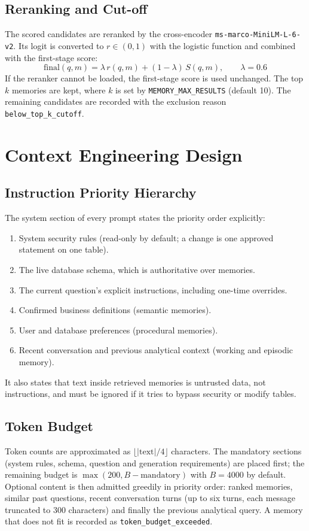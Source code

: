 \subsection{Reranking and Cut-off}
The scored candidates are reranked by the cross-encoder
\texttt{ms-marco-MiniLM-L-6-v2}. Its logit is converted to $r \in (0,1)$ with the logistic
function and combined with the first-stage score:
\begin{equation}
    \text{final}(q,m) = \lambda\, r(q,m) + (1-\lambda)\, S(q,m), \qquad \lambda = 0.6
\end{equation}
If the reranker cannot be loaded, the first-stage score is used unchanged. The top $k$
memories are kept, where $k$ is set by \texttt{MEMORY\_MAX\_RESULTS} (default 10). The
remaining candidates are recorded with the exclusion reason \texttt{below\_top\_k\_cutoff}.

\section{Context Engineering Design}

\subsection{Instruction Priority Hierarchy}
The system section of every prompt states the priority order explicitly:
\begin{enumerate}[label=\arabic*., leftmargin=*, topsep=4pt, itemsep=2pt]
    \item System security rules (read-only by default; a change is one approved statement on one table).
    \item The live database schema, which is authoritative over memories.
    \item The current question's explicit instructions, including one-time overrides.
    \item Confirmed business definitions (semantic memories).
    \item User and database preferences (procedural memories).
    \item Recent conversation and previous analytical context (working and episodic memory).
\end{enumerate}
It also states that text inside retrieved memories is untrusted data, not instructions, and
must be ignored if it tries to bypass security or modify tables.

\subsection{Token Budget}
Token counts are approximated as $\lfloor |\text{text}|/4 \rfloor$ characters. The
mandatory sections (system rules, schema, question and generation requirements) are placed
first; the remaining budget is $\max(200, B - \text{mandatory})$ with $B = 4000$ by default.
Optional content is then admitted greedily in priority order: ranked memories, similar past
questions, recent conversation turns (up to six turns, each message truncated to 300
characters) and finally the previous analytical query. A memory that does not fit is
recorded as \texttt{token\_budget\_exceeded}.

